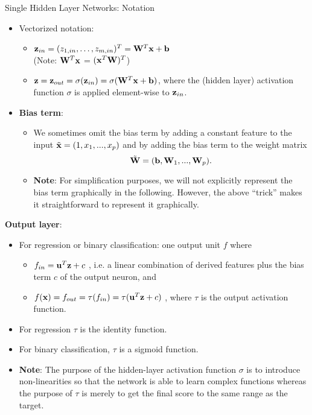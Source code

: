 \documentclass[11pt,compress,t,notes=noshow, xcolor=table]{beamer}
\begin{document}
\begin{vbframe}{Single Hidden Layer Networks: Notation}
\begin{itemize}
\item Vectorized notation:
\begin{itemize}
\item $ \mathbf{z}_{in} = (z_{1,in}, \dots, z_{m,in})^T = \mathbf{W}^T \mathbf{x} + \mathbf{b}$ \\ (Note: $\mathbf{W}^T \mathbf{x}$ = $(\mathbf{x}^T \mathbf{W})^T$)
\item $ \mathbf{z} = \mathbf{z}_{out} = \sigma(\mathbf{z}_{in}) = \sigma(\mathbf{W}^T \mathbf{x} + \mathbf{b})$, where the (hidden layer) activation function $\sigma$ is applied element-wise to $\mathbf{z}_{in}$.  
\end{itemize}
\framebreak
\item \textbf{Bias term}:         
\begin{itemize}
\item We sometimes omit the bias term by adding a constant feature to the input $\tilde{\mathbf{x}} = (1, x_1, ..., x_p)$ and by adding the bias term to the weight matrix 
$$\tilde{\mathbf{W}} = (\mathbf{b}, \mathbf{W}_1, ..., \mathbf{W}_p).$$ 
\item \textbf{Note}: For simplification purposes, we will not explicitly represent the bias term graphically in the following. However, the above \enquote{trick} makes it straightforward to represent it graphically. 
\end{itemize}
\end{itemize}
\framebreak

  \textbf{Output layer}:
  \begin{itemize}
    \vspace{4mm}
    \item For regression or binary classification: one output unit $f$ where
      \begin{itemize}
        \item $f_{in} = \mathbf{u}^T \mathbf{z} + c$ , i.e. a linear combination of derived features plus the bias term $c$ of the output neuron, and
        \vspace{2mm}
        \item $f(\mathbf{x})= f_{out} = \tau(f_{in}) = \tau(\mathbf{u}^T \mathbf{z} + c)$ , where $\tau$ is the output activation function.
      \end{itemize}
    \item For regression $\tau$ is the identity function.
    \item For binary classification, $\tau$ is a sigmoid function.
    \item \textbf{Note}: The purpose of the hidden-layer activation function $\sigma$ is to introduce non-linearities so that the network is able to learn complex functions whereas the purpose of $\tau$ is merely to get the final score to the same range as the target.
  \end{itemize}


\end{vbframe}
\end{document}
